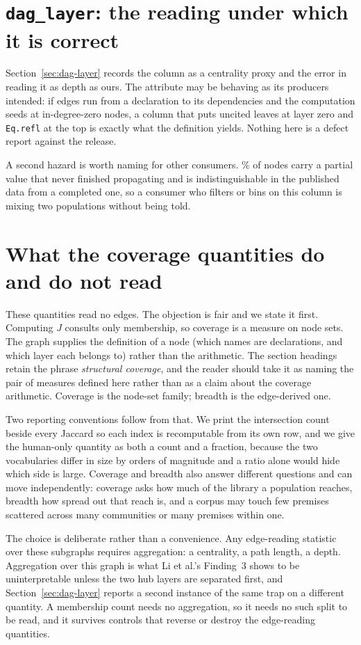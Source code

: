 \section{\texttt{dag\_layer}: the reading under which it is correct}
\label{app:daglayer}

Section~\ref{sec:dag-layer} records the column as a centrality proxy and the
error in reading it as depth as ours. The attribute may be behaving as its
producers intended: if edges run from a declaration to its dependencies and the
computation seeds at in-degree-zero nodes, a column that puts uncited leaves at
layer zero and \texttt{Eq.refl} at the top is exactly what the definition
yields. Nothing here is a defect report against the release.

A second hazard is worth naming for other consumers. \layerTruncatedPct{}\% of
nodes carry a partial value that never finished propagating and is
indistinguishable in the published data from a completed one, so a consumer who
filters or bins on this column is mixing two populations without being told.

\section{What the coverage quantities do and do not read}
\label{app:construct}

These quantities read no edges. The objection is fair and we state it first.
Computing $J$ consults only membership, so coverage is a measure on node sets. The
graph supplies the definition of a node (which names are declarations, and
which layer each belongs to) rather than the arithmetic. The section headings retain the phrase \emph{structural
coverage}, and the reader should take it as naming the pair of measures defined
here rather than as a claim about the coverage arithmetic. Coverage is the
node-set family; breadth is the edge-derived one.

Two reporting conventions follow from that. We print the intersection count
beside every Jaccard so each index is recomputable from its own row, and we
give the human-only quantity as both a count and a fraction, because the two
vocabularies differ in size by orders of magnitude and a ratio alone would hide
which side is large. Coverage and breadth also answer different questions and
can move independently: coverage asks how much of the library a population
reaches, breadth how spread out that reach is, and a corpus may touch few
premises scattered across many communities or many premises within one.

The choice is deliberate rather than a convenience. Any edge-reading statistic
over these subgraphs requires aggregation: a centrality, a path length, a depth.
Aggregation over this graph is what Li et al.'s Finding~3 shows to be
uninterpretable unless the two hub layers are separated first, and
Section~\ref{sec:dag-layer} reports a second instance of the same trap on a
different quantity. A membership count needs no aggregation, so it needs no such
split to be read, and it survives controls that reverse or destroy the
edge-reading quantities.
